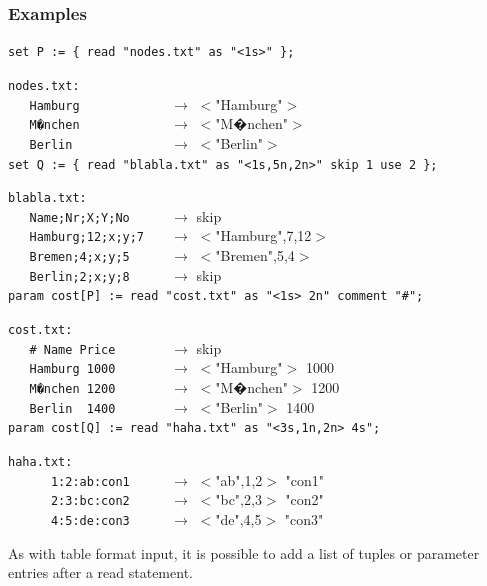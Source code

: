 \subsubsection{Examples}
{\small
\verb|set P := { read "nodes.txt" as "<1s>" };|

\smallskip
\noindent\verb|nodes.txt:|\\
\verb|   Hamburg            | $\rightarrow$ $<$"Hamburg"$>$\\
\verb|   M�nchen            | $\rightarrow$ $<$"M�nchen"$>$\\
\verb|   Berlin             | $\rightarrow$ $<$"Berlin"$>$\\

\smallskip
\noindent\verb|set Q := { read "blabla.txt" as "<1s,5n,2n>" skip 1 use 2 };|

\smallskip
\noindent\verb|blabla.txt:|\\
\verb|   Name;Nr;X;Y;No     | $\rightarrow$ skip\\
\verb|   Hamburg;12;x;y;7   | $\rightarrow$ $<$"Hamburg",7,12$>$\\
\verb|   Bremen;4;x;y;5     | $\rightarrow$ $<$"Bremen",5,4$>$\\
\verb|   Berlin;2;x;y;8     | $\rightarrow$ skip\\

\smallskip
\noindent\verb|param cost[P] := read "cost.txt" as "<1s> 2n" comment "#";|

\smallskip
\noindent\verb|cost.txt:|\\
\verb|   # Name Price       | $\rightarrow$ skip\\
\verb|   Hamburg 1000       | $\rightarrow$ $<$"Hamburg"$>$ 1000\\
\verb|   M�nchen 1200       | $\rightarrow$ $<$"M�nchen"$>$ 1200\\
\verb|   Berlin  1400       | $\rightarrow$ $<$"Berlin"$>$ 1400\\

\smallskip
\noindent\verb|param cost[Q] := read "haha.txt" as "<3s,1n,2n> 4s";|

\smallskip
\noindent\verb|haha.txt:|\\
\verb|      1:2:ab:con1     | $\rightarrow$ $<$"ab",1,2$>$ "con1"\\
\verb|      2:3:bc:con2     | $\rightarrow$ $<$"bc",2,3$>$ "con2"\\
\verb|      4:5:de:con3     | $\rightarrow$ $<$"de",4,5$>$ "con3"\\
}

\noindent As with table format input, it is possible to add a list of tuples or
parameter entries after a read statement.
